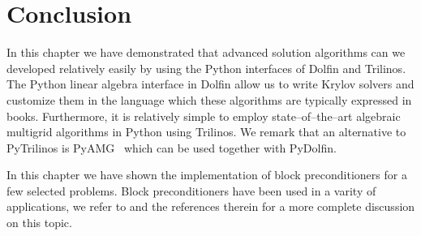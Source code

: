 \section{Conclusion}
In this chapter we have demonstrated that advanced solution algorithms can we developed
relatively easily by using the Python interfaces of Dolfin and Trilinos. The Python linear
algebra interface in Dolfin  allow us to write  Krylov solvers and customize them 
in the language which these algorithms are typically expressed in books. 
Furthermore, it is relatively simple to employ state--of--the--art algebraic multigrid 
algorithms in Python using Trilinos. 
We remark that
an alternative to PyTrilinos is PyAMG~\cite{pyamg} which can be used together with PyDolfin. 


In this chapter we have shown the implementation of block preconditioners for a few selected problems. 
Block preconditioners have been used in a varity of applications, we refer to \cite{M-W-09}
and the references therein for a more complete discussion on this topic. 




